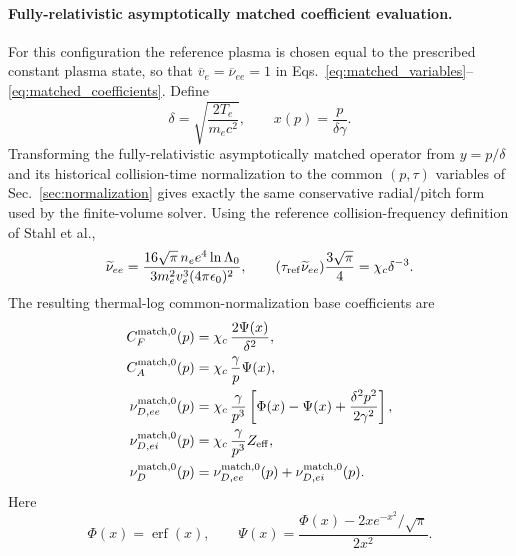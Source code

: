 \documentclass[11pt]{article}
\begin{document}
\paragraph{Fully-relativistic asymptotically matched coefficient evaluation.}
For this configuration the reference plasma is chosen equal to the prescribed
constant plasma state, so that $\overline v_e=\overline\nu_{ee}=1$ in
Eqs.~\eqref{eq:matched_variables}--\eqref{eq:matched_coefficients}.  Define
\begin{equation}
 \delta=\sqrt{\frac{2T_e}{m_ec^2}},\qquad
 x(p)=\frac{p}{\delta\gamma}.
 \label{eq:matched_numeric_scalings}
\end{equation}
Transforming the fully-relativistic asymptotically matched operator from
$y=p/\delta$ and its historical collision-time normalization to the common $(p,\tau)$
variables of Sec.~\ref{sec:normalization} gives
exactly the same conservative radial/pitch form used by the finite-volume solver.  Using
the reference collision-frequency definition of Stahl et al.,
\begin{equation}
 \widetilde\nu_{ee}
 =\frac{16\sqrt{\pi}\,n_e e^4\ln\Lambda_0}
 {3m_e^2v_e^3(4\pi\epsilon_0)^2},
 \qquad
 (\tau_{\rm ref}\widetilde\nu_{ee})\frac{3\sqrt{\pi}}{4}
 =\chi_c\delta^{-3}.
 \label{eq:matched_numeric_frequency_conversion}
\end{equation}
The resulting thermal-log common-normalization base coefficients are
\begin{align}
 C_F^{\rm match,0}(p)
 &=\chi_c\,\frac{2\Psi(x)}{\delta^2},
 \label{eq:matched_numeric_cf}\\
 C_A^{\rm match,0}(p)
 &=\chi_c\,\frac{\gamma}{p}\Psi(x),
 \label{eq:matched_numeric_ca}\\
 \nu_{D,ee}^{\rm match,0}(p)
 &=\chi_c\,\frac{\gamma}{p^3}
 \left[
  \Phi(x)-\Psi(x)+\frac{\delta^2p^2}{2\gamma^2}
 \right],\\
 \nu_{D,ei}^{\rm match,0}(p)
 &=\chi_c\,\frac{\gamma}{p^3}Z_{\rm eff},\\
 \nu_D^{\rm match,0}(p)
 &=\nu_{D,ee}^{\rm match,0}(p)+\nu_{D,ei}^{\rm match,0}(p).
 \label{eq:matched_numeric_nud}
\end{align}
Here
\begin{equation}
 \Phi(x)=\operatorname{erf}(x),\qquad
 \Psi(x)=\frac{\Phi(x)-2x e^{-x^2}/\sqrt{\pi}}{2x^2}.
 \label{eq:matched_numeric_phi_psi}
\end{equation}
\end{document}
